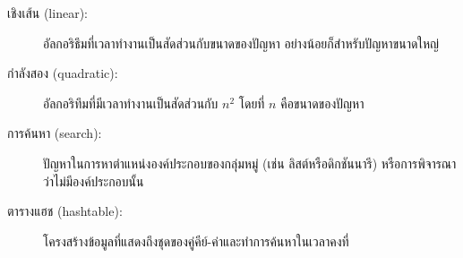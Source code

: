 \begin{description}
\item[เชิงเส้น (linear):] อัลกอริธึมที่เวลาทำงานเป็นสัดส่วนกับขนาดของปัญหา อย่างน้อยก็สำหรับปัญหาขนาดใหญ่

\item[กำลังสอง (quadratic):] อัลกอริทึมที่มีเวลาทำงานเป็นสัดส่วนกับ $n^2$ โดยที่ $n$ คือขนาดของปัญหา

\item[การค้นหา (search):] ปัญหาในการหาตำแหน่งองค์ประกอบของกลุ่มหมู่ (เช่น ลิสต์หรือดิกชันนารี) หรือการพิจารณาว่าไม่มีองค์ประกอบนั้น

\item[ตารางแฮช (hashtable):] โครงสร้างข้อมูลที่แสดงถึงชุดของคู่คีย์-ค่าและทำการค้นหาในเวลาคงที่

\end{description}

\printindex

\clearemptydoublepage



